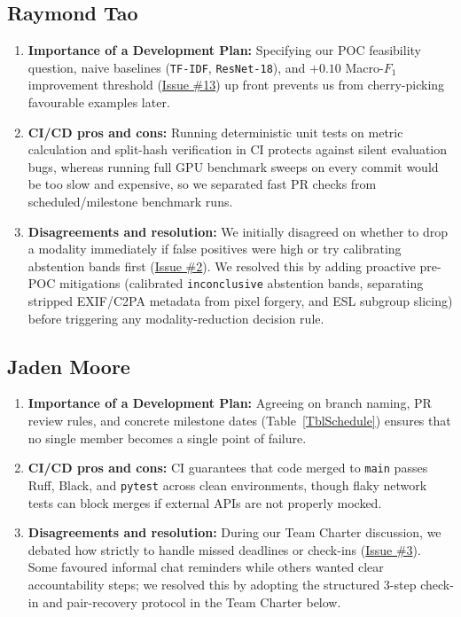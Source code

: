 \documentclass{article}
\begin{document}
\subsection*{Raymond Tao}
\begin{enumerate}[leftmargin=*]
    \item \textbf{Importance of a Development Plan:} Specifying our POC feasibility question, naive baselines (\texttt{TF-IDF}, \texttt{ResNet-18}), and $+0.10$ Macro-$F_1$ improvement threshold (\href{https://github.com/richy1337/Verity/issues/13}{Issue \#13}) up front prevents us from cherry-picking favourable examples later.
    \item \textbf{CI/CD pros and cons:} Running deterministic unit tests on metric calculation and split-hash verification in CI protects against silent evaluation bugs, whereas running full GPU benchmark sweeps on every commit would be too slow and expensive, so we separated fast PR checks from scheduled/milestone benchmark runs.
    \item \textbf{Disagreements and resolution:} We initially disagreed on whether to drop a modality immediately if false positives were high or try calibrating abstention bands first (\href{https://github.com/richy1337/Verity/issues/2}{Issue \#2}). We resolved this by adding proactive pre-POC mitigations (calibrated \texttt{inconclusive} abstention bands, separating stripped EXIF/C2PA metadata from pixel forgery, and ESL subgroup slicing) before triggering any modality-reduction decision rule.
\end{enumerate}

\subsection*{Jaden Moore}
\begin{enumerate}[leftmargin=*]
    \item \textbf{Importance of a Development Plan:} Agreeing on branch naming, PR review rules, and concrete milestone dates (Table~\ref{TblSchedule}) ensures that no single member becomes a single point of failure.
    \item \textbf{CI/CD pros and cons:} CI guarantees that code merged to \texttt{main} passes Ruff, Black, and \texttt{pytest} across clean environments, though flaky network tests can block merges if external APIs are not properly mocked.
    \item \textbf{Disagreements and resolution:} During our Team Charter discussion, we debated how strictly to handle missed deadlines or check-ins (\href{https://github.com/richy1337/Verity/issues/3}{Issue \#3}). Some favoured informal chat reminders while others wanted clear accountability steps; we resolved this by adopting the structured 3-step check-in and pair-recovery protocol in the Team Charter below.
\end{enumerate}
\end{document}
